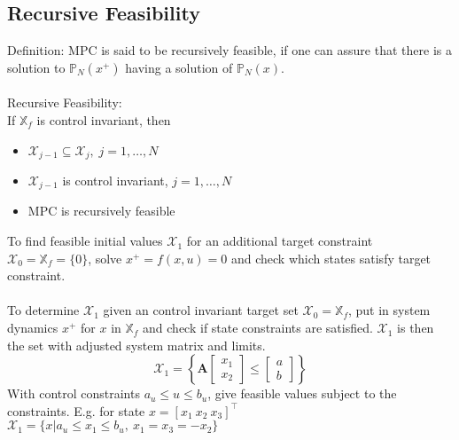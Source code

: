 \documentclass[english]{latex4ei/latex4ei_sheet}
\begin{document}
\begin{sectionbox}
\subsection{Recursive Feasibility}
Definition: MPC is said to be recursively feasible, if one can assure that there is a solution to $\mathbb{P}_N(x^{+})$ having a solution of $\mathbb{P}_N(x)$.\\
\\
Recursive Feasibility:\\
If $\mathbb{X}_f$ is control invariant, then
\begin{itemize}
    \item $\mathcal{X}_{j-1}\subseteq\mathcal{X}_{j},\;j=1,\ldots,N$
    \item $\mathcal{X}_{j-1}$ is control invariant, $j=1,\ldots,N$
    \item MPC is recursively feasible
\end{itemize}
\vspace{0.2cm}
To find feasible initial values $\mathcal{X}_1$ for an additional target constraint $\mathcal{X}_0=\mathbb{X}_f=\{0\}$, solve $x^{+}=f(x,u)=0$ and check which states satisfy target constraint.\\
\\
To determine $\mathcal{X}_1$ given an control invariant target set $\mathcal{X}_0=\mathbb{X}_f$, put in system dynamics $x^{+}$ for $x$ in $\mathbb{X}_f$ and check if state constraints are satisfied. $\mathcal{X}_1$ is then the set with adjusted system matrix and limits.
$$\mathcal{X}_1=\left\{\mathbf{A}\begin{bmatrix}x_1 \\ x_2 \end{bmatrix}\leq\begin{bmatrix}a \\ b \end{bmatrix}\right\}$$
With control constraints $a_u\leq u\leq b_u$, give feasible values subject to the constraints. E.g. for state $x=\left[x_1\ x_2\ x_3\right]^{\top}$\\ $\mathcal{X}_1=\{x| a_u \leq x_1 \leq b_u,\ x_1=x_3=-x_2\}$

\end{sectionbox}

\newpage
\end{document}
